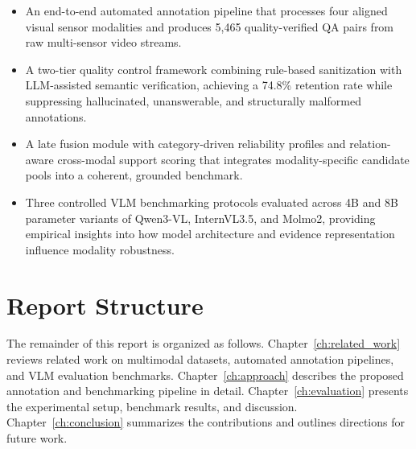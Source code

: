 \begin{itemize}
    \item An end-to-end automated annotation pipeline that processes four aligned
          visual sensor modalities and produces 5,465 quality-verified QA pairs
          from raw multi-sensor video streams.

    \item A two-tier quality control framework combining rule-based sanitization
          with LLM-assisted semantic verification, achieving a 74.8\% retention rate
          while suppressing hallucinated, unanswerable, and structurally malformed
          annotations.

    \item A late fusion module with category-driven reliability profiles and
          relation-aware cross-modal support scoring that integrates modality-specific
          candidate pools into a coherent, grounded benchmark.

    \item Three controlled VLM benchmarking protocols evaluated across 4B and 8B
          parameter variants of Qwen3-VL, InternVL3.5, and Molmo2, providing
          empirical insights into how model architecture and evidence representation
          influence modality robustness.
\end{itemize}

\section{Report Structure}
\label{sec:intro_structure}

The remainder of this report is organized as follows.
Chapter~\ref{ch:related_work} reviews related work on multimodal datasets,
automated annotation pipelines, and VLM evaluation benchmarks.
Chapter~\ref{ch:approach} describes the proposed annotation and benchmarking
pipeline in detail.
Chapter~\ref{ch:evaluation} presents the experimental setup, benchmark results,
and discussion.
Chapter~\ref{ch:conclusion} summarizes the contributions and outlines directions
for future work.
